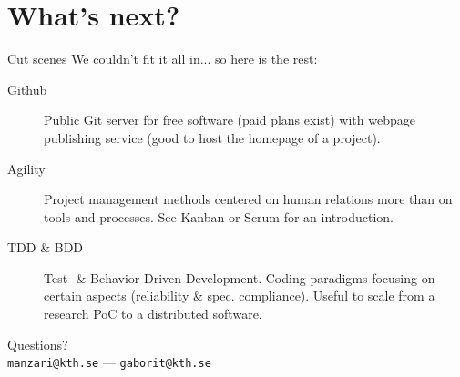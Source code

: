 \documentclass[10pt]{beamer}
\begin{document}

\section{What's next?} %

\begin{frame}{Cut scenes}
		We couldn't fit it all in... so here is the rest:

		\begin{description}
			\item[Github] Public Git server for free software (paid plans exist)
				with webpage publishing service (good to host the homepage of a project).
			\item[Agility] Project management methods centered on human relations more than on
				tools and processes. See Kanban or Scrum for an introduction.
			\item[TDD \& BDD] Test- \& Behavior Driven Development. Coding paradigms focusing
				on certain aspects (reliability \& spec. compliance). Useful to scale from a
				research PoC to a distributed software.
		\end{description}
\end{frame}


\begin{frame}[standout] %
	\vspace{0.05\textwidth}
	Questions?\\
	\vspace{0.25\textwidth}
	\scriptsize{\texttt{manzari@kth.se}} --- \scriptsize{\texttt{gaborit@kth.se}}\\
\end{frame}

\end{document}
